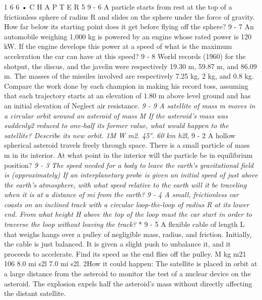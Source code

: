 \documentclass[10pt,oneside]{article}
\begin{document}
1 6 6 • C H A P T E R  5 \emph{ } 9 - 6 A particle starts from rest at the top of a frictionless sphere of radius R and slides on the sphere under the force of gravity. How far below its starting point does it get before flying off the sphere? \emph{ } 9 - 7 An automobile weighing 1,000 kg is powered by an engine whose rated power is 120 kW. If the engine develops this power at a speed of what is the maximum acceleration the car can have at this speed? \emph{ } 9 - 8 World records (1960) for the shotput, the discus, and the javelin were respectively 19.30 m, 59.87 m, and 86.09 m. The masses of the missiles involved are respectively 7.25 kg, 2 kg, and 0.8 kg. Compare the work done by each champion in making his record toss, assuming that each trajectory starts at an elevation of 1.80 m above level ground and has an initial elevation of Neglect air resistance. \emph{ } \emph{ 9 - 9 A satellite of mass m moves in a circular orbit around an asteroid of mass M If the asteroid’s mass was suddenly2 reduced to one-half its former value, what would happen to the satellite? Describe its new orbit. 1M W m2. 45°. 60 km h2l, } 9 - 2 A hollow spherical asteroid travels freely through space. There is a small particle of mass m in its interior. At what point in the interior will the particle be in equilibrium position? \emph{ 9 - 3 The speed needed for a body to leave the earth’s gravitational field is (approximately) If an interplanetary probe is given an initial speed of just above the earth’s atmosphere, with what speed relative to the earth will it be traveling when it is at a distance of mi from the earth? } \emph{ 9 - 4 A small, frictionless car coasts on an inclined track with a circular loop-the-loop of radius R at its lower end. From what height H above the top of the loop must the car start in order to traverse the loop without leaving the track? } * 9 - 5 A flexible cable of length L that weighs hangs over a pulley of negligible mass, radius, and friction. Initially, the cable is just balanced. It is given a slight push to unbalance it, and it proceeds to accelerate. Find its speed as the end flies off the pulley. M kg m21 106 8.0 mi s2l 7.0 mi s2l. 2How it could happen: The satellite is placed in orbit at a large distance from the asteroid to monitor the test of a nuclear device on the asteroid. The explosion expels half the asteroid’s mass without directly affecting the distant satellite.\par
\end{document}
